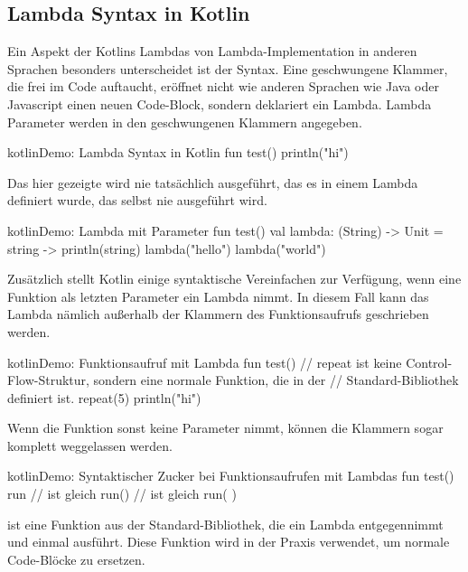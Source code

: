\subsection{Lambda Syntax in Kotlin}
Ein Aspekt der Kotlins Lambdas von Lambda-Implementation in anderen Sprachen besonders unterscheidet ist der Syntax.
Eine geschwungene Klammer, die frei im Code auftaucht, eröffnet nicht wie anderen Sprachen wie \zB Java oder Javascript
einen neuen Code-Block, sondern deklariert ein Lambda.
Lambda Parameter werden in den geschwungenen Klammern angegeben.\cite{kspecLambdaLiteral}

\begin{codeBlock}{kotlin}{Demo: Lambda Syntax in Kotlin}
fun test() {
    {
        println("hi")
    }
}
\end{codeBlock}

Das hier gezeigte  wird nie tatsächlich ausgeführt, das es in einem Lambda
definiert wurde, das selbst nie ausgeführt wird.

\begin{codeBlock}{kotlin}{Demo: Lambda mit Parameter}
fun test() {
    val lambda: (String) -> Unit = { string -> println(string) }
    lambda("hello")
    lambda("world")
}
\end{codeBlock}

Zusätzlich stellt Kotlin einige syntaktische Vereinfachen zur Verfügung, wenn eine Funktion als letzten Parameter
ein Lambda nimmt.
In diesem Fall kann das Lambda nämlich außerhalb der Klammern des Funktionsaufrufs geschrieben werden.

\begin{codeBlock}{kotlin}{Demo: Funktionsaufruf mit Lambda}
fun test() {
    // repeat ist keine Control-Flow-Struktur, sondern eine normale Funktion, die in der
    // Standard-Bibliothek definiert ist.
    repeat(5) {
        println("hi")
    }
}
\end{codeBlock}

Wenn die Funktion sonst keine Parameter nimmt, können die Klammern sogar komplett weggelassen werden.

\begin{codeBlock}{kotlin}{Demo: Syntaktischer Zucker bei Funktionsaufrufen mit Lambdas}
fun test() {
    run {
    }
    // ist gleich
    run() {
    }
    // ist gleich
    run({ })
}
\end{codeBlock}

 ist eine Funktion aus der Standard-Bibliothek, die ein Lambda entgegennimmt und einmal ausführt.
Diese Funktion wird in der Praxis verwendet, um normale Code-Blöcke zu ersetzen.

